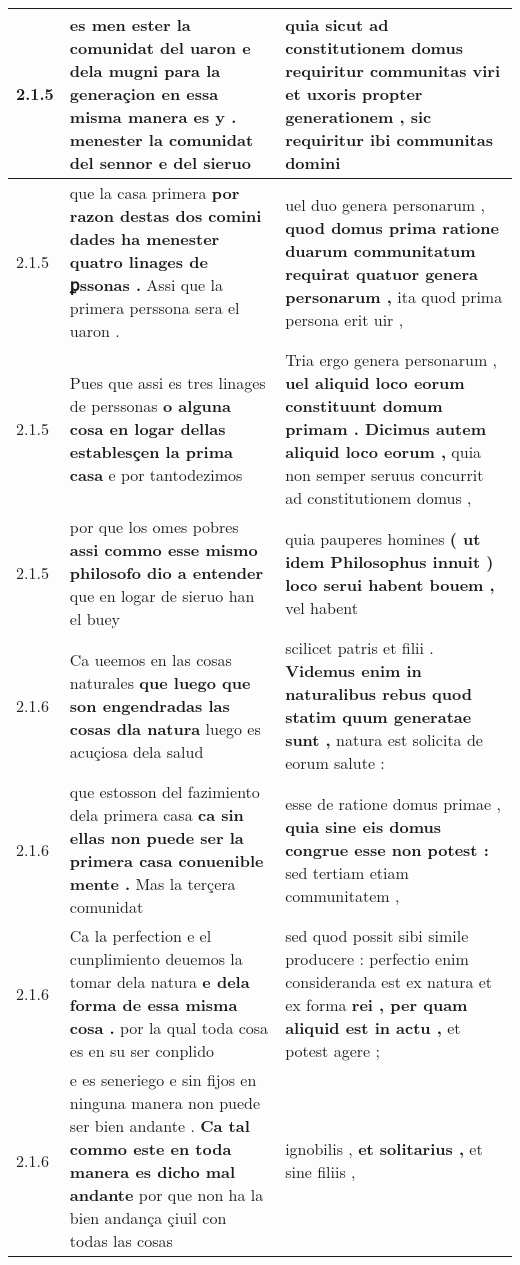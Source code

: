 \begin{tabular}{|p{1cm}|p{6.5cm}|p{6.5cm}|}
2.1.5 & es men ester la comunidat del uaron e dela mugni \textbf{ para la generaçion en essa misma manera es y . } menester la comunidat del sennor e del sieruo & quia sicut ad constitutionem domus requiritur communitas viri \textbf{ et uxoris propter generationem , } sic requiritur ibi communitas domini \\\hline
2.1.5 & que la casa primera \textbf{ por razon destas dos comini dades ha menester quatro linages de ꝑssonas . } Assi que la primera perssona sera el uaron . & uel duo genera personarum , \textbf{ quod domus prima ratione duarum communitatum requirat quatuor genera personarum , } ita quod prima persona erit uir , \\\hline
2.1.5 & Pues que assi es tres linages de perssonas \textbf{ o alguna cosa en logar dellas establesçen la prima casa } e por tantodezimos & Tria ergo genera personarum , \textbf{ uel aliquid loco eorum constituunt domum primam . Dicimus autem aliquid loco eorum , } quia non semper seruus concurrit ad constitutionem domus , \\\hline
2.1.5 & por que los omes pobres \textbf{ assi commo esse mismo philosofo dio a entender } que en logar de sieruo han el buey & quia pauperes homines \textbf{ ( ut idem Philosophus innuit ) loco serui habent bouem , } vel habent \\\hline
2.1.6 & Ca ueemos en las cosas naturales \textbf{ que luego que son engendradas las cosas dla natura } luego es acuçiosa dela salud & scilicet patris et filii . \textbf{ Videmus enim in naturalibus rebus quod statim quum generatae sunt , } natura est solicita de eorum salute : \\\hline
2.1.6 & que estosson del fazimiento dela primera casa \textbf{ ca sin ellas non puede ser la primera casa conuenible mente . } Mas la terçera comunidat & esse de ratione domus primae , \textbf{ quia sine eis domus congrue esse non potest : } sed tertiam etiam communitatem , \\\hline
2.1.6 & Ca la perfection e el cunplimiento deuemos la tomar dela natura \textbf{ e dela forma de essa misma cosa . } por la qual toda cosa es en su ser conplido & sed quod possit sibi simile producere : perfectio enim consideranda est ex natura et ex forma \textbf{ rei , per quam aliquid est in actu , } et potest agere ; \\\hline
2.1.6 & e es seneriego e sin fijos en ninguna manera non puede ser bien andante . \textbf{ Ca tal commo este en toda manera es dicho mal andante } por que non ha la bien andança çiuil con todas las cosas & ignobilis , \textbf{ et solitarius , } et sine filiis , \\\hline

\end{tabular}
